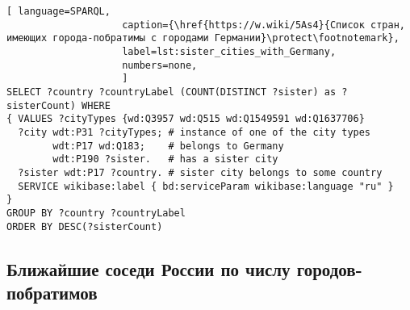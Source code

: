 \begin{lstlisting}[ language=SPARQL, 
                    caption={\href{https://w.wiki/5As4}{Список стран, имеющих города-побратимы с городами Германии}\protect\footnotemark},
                    label=lst:sister_cities_with_Germany,
                    numbers=none,
                    ]
SELECT ?country ?countryLabel (COUNT(DISTINCT ?sister) as ?sisterCount) WHERE
{ VALUES ?cityTypes {wd:Q3957 wd:Q515 wd:Q1549591 wd:Q1637706}
  ?city wdt:P31 ?cityTypes; # instance of one of the city types
        wdt:P17 wd:Q183;    # belongs to Germany
        wdt:P190 ?sister.   # has a sister city
  ?sister wdt:P17 ?country. # sister city belongs to some country
  SERVICE wikibase:label { bd:serviceParam wikibase:language "ru" }
}
GROUP BY ?country ?countryLabel
ORDER BY DESC(?sisterCount)\end{lstlisting}%





\subsection{Ближайшие соседи России по числу городов-побратимов}

